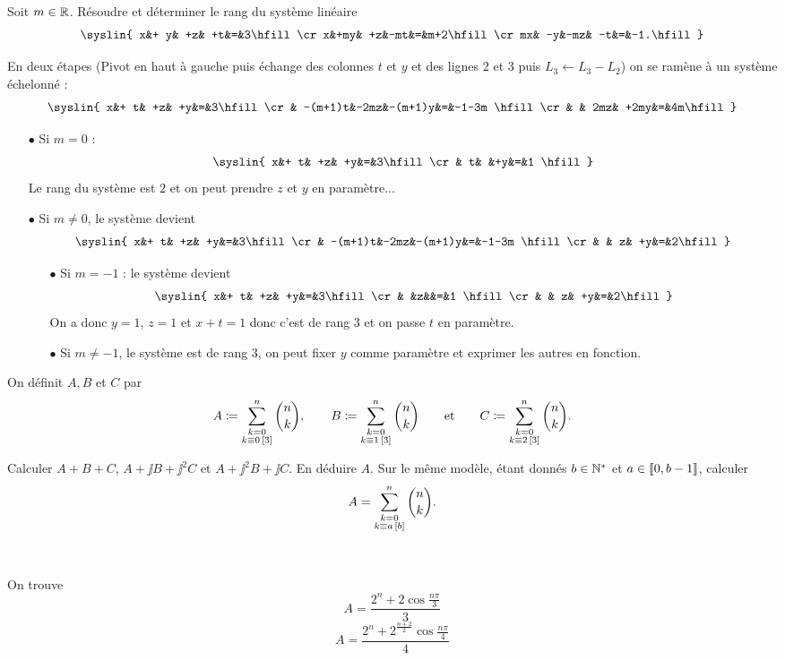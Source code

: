 \documentclass{magnolia}
\begin{document}
Soit $m\in\mathbb{R}$. Résoudre et déterminer le rang du système linéaire
\[\syslin{ x&+ y& +z& +t&=&3\hfill\cr
           x&+my& +z&-mt&=&m+2\hfill\cr
          mx& -y&-mz& -t&=&-1.\hfill}\]
\begin{sol}
En deux étapes (Pivot en haut à gauche puis échange des colonnes $t$ et $y$ et des lignes $2$ et $3$ puis $L_3\leftarrow L_3-L_2$) on se ramène à un système échelonné :
\[\syslin{ x&+ t& +z& +y&=&3\hfill\cr
           &  -(m+1)t&-2mz&-(m+1)y&=&-1-3m \hfill\cr
          & & 2mz& +2my&=&4m\hfill}\]
\begin{itemize}
\item[$\bullet$] Si $m=0$ :
\[\syslin{ x&+ t& +z& +y&=&3\hfill\cr
           &  t& &+y&=&1 \hfill}\]
           Le rang du système est $2$ et on peut prendre $z$ et $y$ en paramètre...
\item[$\bullet$] Si $m\neq 0$, le système devient 
\[\syslin{ x&+ t& +z& +y&=&3\hfill\cr
           &  -(m+1)t&-2mz&-(m+1)y&=&-1-3m \hfill\cr
          & & z& +y&=&2\hfill}\]
          \begin{itemize}
\item[$\bullet$] Si $m=-1$ : le système devient 
\[\syslin{ x&+ t& +z& +y&=&3\hfill\cr
           &  &z&&=&1 \hfill\cr
          & & z& +y&=&2\hfill}\]
          On a donc $y=1$, $z=1$ et $x+t=1$ donc c'est de rang $3$ et on passe $t$ en paramètre.
\item[$\bullet$] Si $m\neq -1$, le système est de rang $3$, on peut fixer $y$ comme paramètre et exprimer les autres en fonction. 
\end{itemize}
\end{itemize}
\end{sol}

On définit $A,B$ et $C$ par
$$A\coloneqq\sum_{\substack{k=0\\k\equiv 0\,\left[3\right]}}^{n} \binom{n}{k}, \qquad
  B\coloneqq\sum_{\substack{k=0\\k\equiv 1\,\left[3\right]}}^{n} \binom{n}{k} \qquad\text{et}\qquad
  C\coloneqq\sum_{\substack{k=0\\k\equiv 2\,\left[3\right]}}^{n} \binom{n}{k}.$$
\begin{questions}
\question Calculer $A+B+C$, $A+\jj B+\jj^2C$ et $A+\jj^2B+\jj C$.
\question En déduire $A$.
\question Sur le même modèle, étant donnés $b\in{\mathbb{N}^*}$ et $a\in\left\llbracket 0,b-1\right\rrbracket$, calculer
  $$A=\sum_{\substack{k=0\\k\equiv a\,\left[b\right]}}^{n} \binom{n}{k}.$$
\end{questions}
\begin{sol}
$\quad$
\begin{questions}
\question
\question On trouve
  \[A=\frac{2^n+2\cos\frac{n\pi}{3}}{3}\]
\question
  \[A=\frac{2^n+2^{\frac{n+2}{2}}\cos\frac{n\pi}{4}}{4}\]
\end{questions}
\end{sol}



\end{document}
